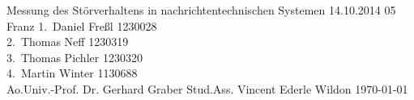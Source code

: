 \TUHeader                          %
{Messung des Störverhaltens in nachrichtentechnischen Systemen}                       %
{14.10.2014}                        %
{05}                            %
{Franz}                   %
{
1.~Daniel Freßl 1230028\\
2.~Thomas Neff 1230319\\                    %
3.~Thomas Pichler 1230320\\ 
4.~Martin Winter 1130688 \\                 %
}
{Ao.Univ.-Prof. Dr. Gerhard Graber}
{Stud.Ass. Vincent Ederle}                          %
{Wildon}                              %
{\today}                            %




\pagebreak
  
\tableofcontents
  
\pagebreak